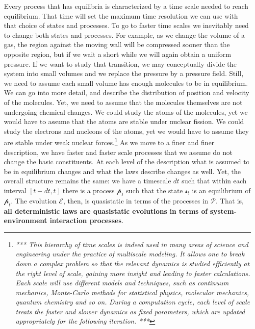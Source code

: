 \documentclass[applsci,article,submit,moreauthors,pdftex]{Definitions/mdpi}
\newcommand{\edit}[1] {\emph{*** #1 ***}}
\begin{document}
Every process that has equilibria is characterized by a time scale needed to reach equilibrium. That time will set the maximum time resolution we can use with that choice of states and processes. To go to faster time scales we inevitably need to change both states and processes. For example, as we change the volume of a gas, the region against the moving wall will be compressed sooner than the opposite region, but if we wait a short while we will again obtain a uniform pressure. If we want to study that transition, we may conceptually divide the system into small volumes and we replace the pressure by a pressure field. Still, we need to assume each small volume has enough molecules to be in equilibrium. We can go into more detail, and describe the distribution of position and velocity of the molecules. Yet, we need to assume that the molecules themselves are not undergoing chemical changes. We could study the atoms of the molecules, yet we would have to assume that the atoms are stable under nuclear fission. We could study the electrons and nucleons of the atoms, yet we would have to assume they are stable under weak nuclear forces.\footnote{\edit{This hierarchy of time scales is indeed used in many areas of science and engineering under the practice of multiscale modeling. \cite{Horstemeyer,Weinan} It allows one to break down a complex problem so that the relevant dynamics is studied efficiently at the right level of scale, gaining more insight and leading to faster calculations. Each scale will use different models and techniques, such as continuum mechanics, Monte-Carlo methods for statistical physics, molecular mechanics, quantum chemistry and so on. \cite{Brandt} During a computation cycle, each level of scale treats the faster and slower dynamics as fixed parameters, which are updated appropriately for the following iteration.}} As we move to a finer and finer description, we have faster and faster scale processes that we assume do not change the basic constituents. At each level of the description what is assumed to be in equilibrium changes and what the laws describe changes as well. Yet, the overall structure remains the same: we have a timescale $dt$ such that within each interval $[t-dt, t]$ there is a process $\mathcal{p}_t$ such that the state $\mathcal{s}_t$ is an equilibrium of $\mathcal{p}_t$. The evolution $\mathcal{E}$, then, is quasistatic in terms of the processes in $\mathcal{P}$. That is, \textbf{all deterministic laws are quasistatic evolutions in terms of system-environment interaction processes}.
\end{document}
